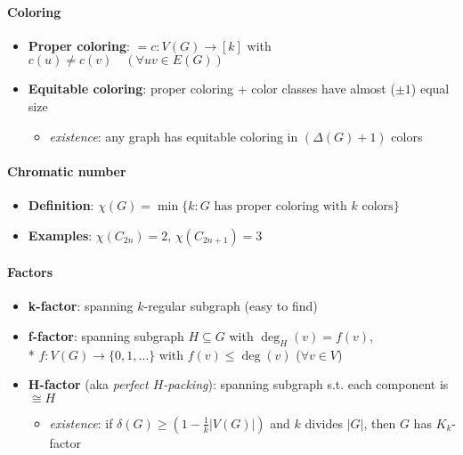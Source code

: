 \paragraph{Coloring}
\begin{itemize}
  \item \textbf{Proper coloring}: $ = c : V(G) \to [k] $ with $ c(u) \neq c(v) \quad (\forall uv \in E(G)) $
  \item \textbf{Equitable coloring}: proper coloring + color classes have almost ($ \pm 1 $) equal size
  \begin{itemize}
    \item \emph{existence}: any graph has equitable coloring in $ (\Delta(G) + 1) $ colors 
  \end{itemize}
\end{itemize}

\paragraph{Chromatic number}
\begin{itemize}
  \item \textbf{Definition}: $ \chi(G) = \min\{ k: G \text{ has proper coloring with } k \text{ colors} \} $ 
  \item \textbf{Examples}: $ \chi(C_{2n}) = 2 $, $ \chi(C_{2n+1}) = 3 $
\end{itemize}

\paragraph{Factors}
\begin{itemize}
  \item \textbf{k-factor}: spanning $ k $-regular subgraph (easy to find) 
  \item \textbf{f-factor}: spanning subgraph $ H \subseteq G $ with $ \deg_H(v) = f(v) $, \\*
    $ f: V(G) \to \{ 0,1,\dots \} $ with $ f(v) \leq \deg(v) $ \quad ($ \forall v \in V $)
  \item \textbf{H-factor} (aka \emph{perfect $ H $-packing}): spanning subgraph s.t. each component is $ \cong H $
  \begin{itemize}
    \item \emph{existence}: if $ \delta(G) \geq \left( 1 - \tfrac{1}{k}\vert V(G) \vert \right) $ and $ k $ divides $ \vert G \vert $, then $ G $ has $ K_k $-factor
  \end{itemize}
\end{itemize}


